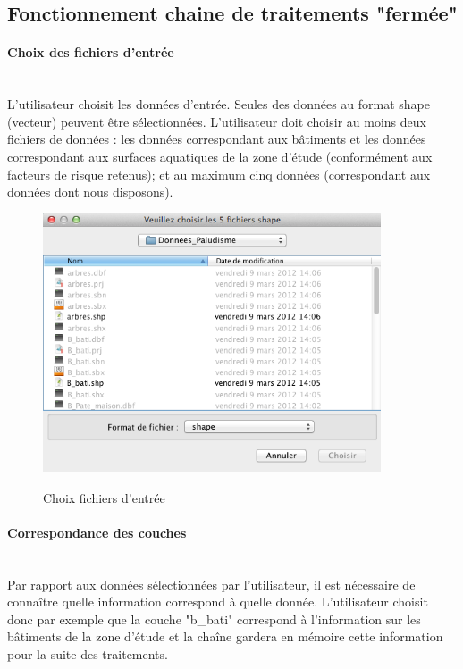 \subsection{Fonctionnement chaine de traitements "fermée"}


\paragraph{Choix des fichiers d'entrée\\\\}

L'utilisateur choisit les données d'entrée. Seules des données au format shape (vecteur) peuvent être sélectionnées. L'utilisateur doit choisir au moins deux fichiers de données : les données correspondant aux bâtiments et les données correspondant aux surfaces aquatiques de la zone d'étude (conformément aux facteurs de risque retenus); et au maximum cinq données (correspondant aux données dont nous disposons).\\

\begin{figure}[H]
\begin{center}
\includegraphics[width=10cm]{Chaine1}\\
\caption{\label{Chaine1} Choix fichiers d'entrée}
\end{center}
\end{figure}


\paragraph{Correspondance des couches\\\\}

Par rapport aux données sélectionnées par l'utilisateur, il est nécessaire de connaître quelle information correspond à quelle donnée. L'utilisateur choisit donc par exemple que la couche "b\_bati" correspond à l'information sur les bâtiments de la zone d'étude et la chaîne gardera en mémoire cette information pour la suite des traitements.\\

